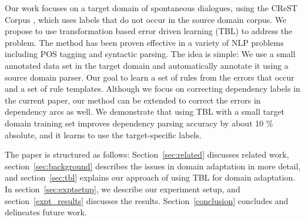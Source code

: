 Our work focuses on a target domain of spontaneous dialogues, using the CReST Corpus \citep{eberhard2010indiana}, %
which uses labels that do not occur in the source domain corpus. We propose to use 
transformation based error driven learning (TBL) \cite{Brill:1995:TEL:218355.218367} to address the problem. The method has been proven effective in a variety of NLP problems including POS tagging and syntactic parsing. The idea is simple:  We use a small annotated data set in the target domain and automatically annotate it using a source domain parser.  Our goal to learn a set of rules from the errors that occur and a set of rule templates. 
Although we focus on correcting dependency labels in the current paper, our method can be extended to correct the errors in dependency arcs as well.
We demonstrate that using TBL with a small target domain training set improves dependency parsing accuracy by about 10 \% absolute, and it learns to use the target-specific labels. 

The paper is structured as follows: Section~\ref{sec:related} discusses related work, section~\ref{sec:background} describes the issues in domain adaptation in more detail, and section~\ref{sec:tbl} explains our approach of using
TBL for domain adaptation. In section~\ref{sec:exptsetup}, we describe our experiment setup, and section~\ref{expt_results} discusses the results. Section~\ref{conclusion} concludes and delineates
future work.


